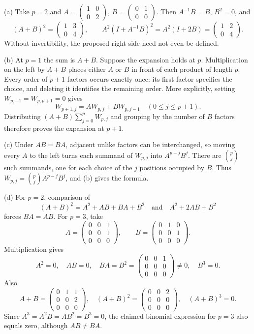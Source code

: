 \begin{solution}
(a) Take $p=2$ and
$A=\begin{pmatrix}1&0\\0&2\end{pmatrix}$,
$B=\begin{pmatrix}0&1\\0&0\end{pmatrix}$.
Then $A^{-1}B=B$, $B^2=0$, and
\[
(A+B)^2=\begin{pmatrix}1&3\\0&4\end{pmatrix},
\qquad
A^2(I+A^{-1}B)^2=A^2(I+2B)=\begin{pmatrix}1&2\\0&4\end{pmatrix}.
\]
Without invertibility, the proposed right side need not even be defined.

(b) At $p=1$ the sum is $A+B$.
Suppose the expansion holds at $p$. Multiplication on the left by $A+B$
places either $A$ or $B$ in front of each product of length $p$.
Every order of $p+1$ factors occurs exactly once: its first factor specifies
the choice, and deleting it identifies the remaining order.
More explicitly, setting $W_{p,-1}=W_{p,p+1}=0$ gives
\[
W_{p+1,j}=AW_{p,j}+BW_{p,j-1}\quad(0\leqslant j\leqslant p+1).
\]
Distributing $(A+B)\sum_{j=0}^pW_{p,j}$ and grouping by the number of $B$ factors
therefore proves the expansion at $p+1$.

(c) Under $AB=BA$, adjacent unlike factors can be interchanged, so moving every
$A$ to the left turns each summand of $W_{p,j}$ into $A^{p-j}B^j$.
There are $\binom pj$ such summands, one for each choice of the $j$ positions
occupied by $B$. Thus $W_{p,j}=\binom pj A^{p-j}B^j$, and (b) gives the formula.

(d) For $p=2$, comparison of
\[
(A+B)^2=A^2+AB+BA+B^2
\quad\text{and}\quad A^2+2AB+B^2
\]
forces $BA=AB$. For $p=3$, take
\[
A=\begin{pmatrix}0&0&1\\0&0&1\\0&0&0\end{pmatrix},\qquad
B=\begin{pmatrix}0&1&0\\0&0&1\\0&0&0\end{pmatrix}.
\]
Multiplication gives
\[
A^2=0,\quad AB=0,\quad
BA=B^2=\begin{pmatrix}0&0&1\\0&0&0\\0&0&0\end{pmatrix}\ne0,
\quad B^3=0.
\]
Also
\[
A+B=\begin{pmatrix}0&1&1\\0&0&2\\0&0&0\end{pmatrix},\quad
(A+B)^2=\begin{pmatrix}0&0&2\\0&0&0\\0&0&0\end{pmatrix},\quad (A+B)^3=0.
\]
Since $A^3=A^2B=AB^2=B^3=0$, the claimed binomial expression for $p=3$
also equals zero, although $AB\ne BA$.
\end{solution}
